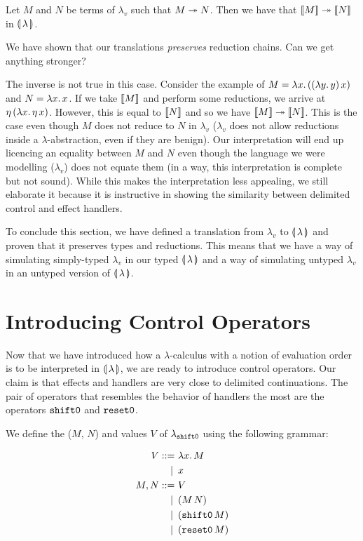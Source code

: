 \begin{corollary}
  Let $M$ and $N$ be terms of $\lambda_v$ such that $M \twoheadrightarrow N$. Then we
  have that $\llbracket M \rrbracket \twoheadrightarrow \llbracket N \rrbracket$ in $\llparenthesis \, \lambda \, \rrparenthesis$.
\end{corollary}

We have shown that our translations \emph{preserves} reduction chains. Can
we get anything stronger?

The inverse is not true in this case. Consider the example of $M =
\lambda x.\, ((\lambda y.\, y)\,x)$ and $N = \lambda x.\, x$. If we take $\llbracket M \rrbracket$
and perform some reductions, we arrive at
$\eta\,(\lambda x.\, \eta\,x)$. However, this is equal to $\llbracket N \rrbracket$
and so we have $\llbracket M \rrbracket \twoheadrightarrow \llbracket N \rrbracket$. This is the case even though $M$
does not reduce to $N$ in $\lambda_v$ ($\lambda_v$ does not allow
reductions inside a $\lambda$-abstraction, even if they are benign). Our
interpretation will end up licencing an equality between $M$ and $N$ even
though the language we were modelling ($\lambda_v$) does not equate them
(in a way, this interpretation is complete but not sound). While this makes
the interpretation less appealing, we still elaborate it because it is
instructive in showing the similarity between delimited control and effect
handlers.

To conclude this section, we have defined a translation from $\lambda_v$
to $\llparenthesis \, \lambda \, \rrparenthesis$ and proven that it preserves types and
reductions. This means that we have a way of simulating simply-typed
$\lambda_v$ in our typed $\llparenthesis \, \lambda \, \rrparenthesis$ and a way of simulating untyped
$\lambda_v$ in an untyped version of $\llparenthesis \, \lambda \, \rrparenthesis$.

\section{Introducing Control Operators}

Now that we have introduced how a $\lambda$-calculus with a notion of
evaluation order is to be interpreted in $\llparenthesis \, \lambda \, \rrparenthesis$, we are ready
to introduce control operators. Our claim is that effects and handlers are
very close to delimited continuations. The pair of operators that resembles
the behavior of handlers the most are the operators $\mathtt{shift0}$ and
$\mathtt{reset0}$.

\begin{definition}
  We define the  ($M$, $N$) and values $V$ of
  $\lambda_{\mathtt{shift0}}$ using the following grammar:

\begin{align*}
  V ::= &\ \lambda x.\, M \\
   | \, &\ x \\
  M, N ::= &\ V \\
   | \, &\ (M\,N) \\
   | \, &\ (\mathtt{shift0}\,M) \\
   | \, &\ (\mathtt{reset0}\,M)
\end{align*}
\end{definition}

